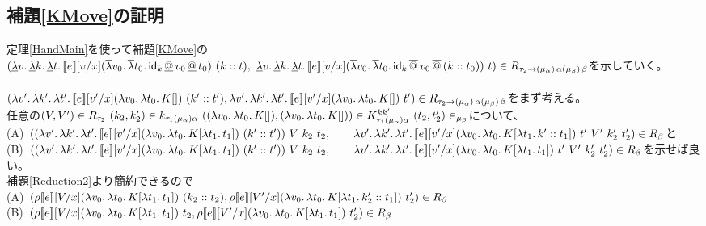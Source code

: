 \subsection{補題\ref{KMove}の証明}
定理\ref{HandMain}を使って補題\ref{KMove}の\\
$(\DLam{v}{\DLam{k}{\DLam{t}{\CPSTh{e}[\Change{x}{v}] \SLamP{v_0}{\SLam{t_0}{\DApp{\Idk}{\DApp{v_0}{t_0}}}}\ \ConsP{k}{t}}}},\\
\ \DLam{v}{\DLam{k}{\DLam{t}{\CPSTh{e}[\Change{x}{v}] \SLamP{v_0}{\SLam{t_0}{\SApp{\Idk}{\SApp{v_0}{\ConsP{k}{t_0}}}}}\ t}}})
\in R_{\tau_2 \rightarrow \TrailType{\alpha} \TrailType{\beta}}$を示していく。\\
\\
$(\Lam{v'}{\Lam{k'}{\Lam{t'}{\CPSTh{e}[\Change{x}{v'}] \LamP{v_0}{\Lam{t_0}{K[]}}\ \ConsP{k'}{t'}}}},\\
\Lam{v'}{\Lam{k'}{\Lam{t'}{\CPSTh{e}[\Change{x}{v'}] \LamP{v_0}{\Lam{t_0}{K[]}}\ t'}}})
\in R_{\tau_2 \rightarrow \TrailType{\alpha} \TrailType{\beta}}$をまず考える。
\\
任意の$(V,V')\in R_{\tau_2}\  (k_2,k_2')\in k_{\tau_1(\mu_{\alpha})\alpha}\  (\LamP{v_0}{\Lam{t_0}{K[]}},\LamP{v_0}{\Lam{t_0}{K[]}})\in K^{kk'}_{\tau_1(\mu_{\alpha})\alpha}\  (t_2,t_2')\in_{\mu_{\beta}}$について、\\
(A)\ $(\LamP{v'}{\Lam{k'}{\Lam{t'}{\CPSTh{e}[\Change{x}{v'}] \LamP{v_0}{\Lam{t_0}{K[\Lam{t_1}{t_1}]}}\ \ConsP{k'}{t'}}}}\ V\ k_2\ t_2,\\
\qquad \Lam{v'}{\Lam{k'}{\Lam{t'}{\CPSTh{e}[\Change{x}{v'}] \LamP{v_0}{\Lam{t_0}{K[\Lam{t_1}{\Cons{k'}{t_1}}]}}\ t'}}}\ V'\ k_2'\ t_2')\in R_{\beta}$と\\
(B)\ $(\LamP{v'}{\Lam{k'}{\Lam{t'}{\CPSTh{e}[\Change{x}{v'}] \LamP{v_0}{\Lam{t_0}{K[\Lam{t_1}{t_1}]}}\ \ConsP{k'}{t'}}}}\ V\ k_2\ t_2,\\
\qquad \Lam{v'}{\Lam{k'}{\Lam{t'}{\CPSTh{e}[\Change{x}{v'}] \LamP{v_0}{\Lam{t_0}{K[\Lam{t_1}{t_1}]}}\ t'}}}\ V'\ k_2'\ t_2')\in R_{\beta}$を示せば良い。\\
補題\ref{Reduction2}より簡約できるので\\
(A)\ $(\rho \CPSTh{e}[\Change{x}{V}] \LamP{v_0}{\Lam{t_0}{K[\Lam{t_1}{t_1}]}}\ \ConsP{k_2}{t_2},
 \rho \CPSTh{e}[\Change{x}{V'}] \LamP{v_0}{\Lam{t_0}{K[\Lam{t_1}{\Cons{k_2'}{t_1}}]}}\ t_2')\in R_{\beta}$\\
(B)\ $(\rho \CPSTh{e}[\Change{x}{V}] \LamP{v_0}{\Lam{t_0}{K[\Lam{t_1}{t_1}]}}\ t_2,
 \rho \CPSTh{e}[\Change{x}{V'}] \LamP{v_0}{\Lam{t_0}{K[\Lam{t_1}{t_1}]}}\ t_2')\in R_{\beta}$\\
